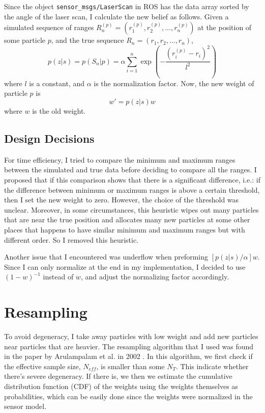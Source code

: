 \documentclass[10pt]{article}
\begin{document}
Since the object \texttt{sensor\_msgs/LaserScan} in ROS has the data array sorted by the angle of the laser scan, I calculate the new belief as follows. Given a simulated sequence of ranges $R^{(p)}_n = (r^{(p)}_1, r^{(p)}_2, \dots, r^{(p)}_n)$ at the position of some particle $p$, and the true sequence $R_n = (r_1, r_2, \dots, r_n)$,
\begin{displaymath}
	p(z|s) = p(S_n|p) = \alpha\sum_{i=1}^n \exp\left(-\frac{\left(r^{(p)}_i - r_i\right)^2}{l^2}\right)
\end{displaymath}
where $l$ is a constant, and $\alpha$ is the normalization factor. Now, the new weight of particle $p$ is  
\begin{displaymath}
	w' = p(z|s)w
\end{displaymath}
where $w$ is the old weight. 

\subsection{Design Decisions}
For time efficiency, I tried to compare the minimum and maximum ranges between the simulated and true data before deciding to compare all the ranges. I proposed that if this comparison shows that there is a significant difference, i.e.: if the difference between minimum or maximum ranges is above a certain threshold, then I set the new weight to zero. However, the choice of the threshold was unclear. Moreover, in some circumstances, this heuristic wipes out many particles that are near the true position and allocates many new particles at some other places that happens to have similar minimum and maximum ranges but with different order. So I removed this heuristic. 

Another issue that I encountered was underflow when preforming 
$[p(z|s)/\alpha]w$. Since I can only normalize at the end in my implementation, I decided to use $(1-w)^{-1}$ instead of $w$, and adjust the normalizing factor accordingly.

\section{Resampling}
To avoid degeneracy, I take away particles with low weight and  add new particles near particles that are heavier. The resampling algorithm that I used was found in the paper by Arulampalam et al. in 2002 \cite[p. 180]{paper}. In this algorithm, we first check if the effective sample size, $N_{eff}$, is smaller than some $N_T$. This indicate whether there's severe degeneracy. If there is, we then we estimate the cumulative distribution function (CDF) of the weights using the weights themselves as probabilities, which can be easily done since the weights were normalized in the sensor model. 
\end{document}
